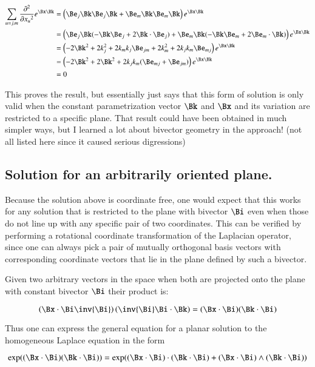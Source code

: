 \begin{align*}
\sum_{u=j,m}\dsqxj{}{u}e^{\Bx\Bk}
&= \left( \Be_j\Bk \Be_j\Bk + \Be_m\Bk \Be_m\Bk \right) e^{\Bx\Bk} \\
&= \left( \Be_j\Bk (-\Bk\Be_j + 2 \Bk \cdot \Be_j) + \Be_m\Bk (-\Bk\Be_m + 2 \Be_m \cdot \Bk) \right) e^{\Bx\Bk} \\
&= \left( -2\Bk^2 + 2 k_j^2 + 2 k_m k_j \Be_{jm} + 2 k_m^2 + 2 k_j k_m \Be_{mj} \right) e^{\Bx\Bk} \\
&= \left( -2\Bk^2 + 2 \Bk^2 + 2 k_j k_m (\Be_{mj} + \Be_{jm}) \right) e^{\Bx\Bk} \\
&= 0 \\
\end{align*}

This proves the result, but essentially just says that this form of
solution is only
valid when the constant parametrization vector $\Bk$ and $\Bx$ and its 
variation are restricted to a specific plane.  That result could have
been obtained in much simpler ways, but I learned a lot about bivector
geometry in the approach! (not all listed here since it caused serious
digressions)

\subsection{Solution for an arbitrarily oriented plane. }

Because the solution above is coordinate free, one would expect that this
works for any solution that is restricted to the plane with bivector $\Bi$
even when those do not line up with any specific pair of two coordinates.
This can be verified by performing a rotational 
coordinate transformation of the 
Laplacian operator, since one can always pick a pair of mutually orthogonal
basis vectors with corresponding coordinate vectors that lie in the plane
defined by such a bivector.

Given two arbitrary vectors in the space when both are projected onto the plane
with constant bivector $\Bi$ their product is:

\[
\left(\Bx \cdot \Bi \inv{\Bi}\right)\left(\inv{\Bi} \Bi \cdot \Bk\right)
=
(\Bx \cdot \Bi)(\Bk \cdot \Bi)
\]

Thus one can express the general equation for a planar solution to the
homogeneous Laplace equation in the form

\begin{equation}
\exp((\Bx \cdot \Bi)(\Bk \cdot \Bi))
=
\exp((\Bx \cdot \Bi) \cdot (\Bk \cdot \Bi) +
     (\Bx \cdot \Bi) \wedge (\Bk \cdot \Bi) )
\end{equation}

